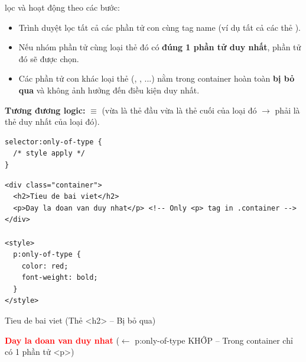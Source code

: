 \begin{conceptBox}
 lọc và hoạt động theo các bước:
\begin{itemize}[leftmargin=1.5em, itemsep=2pt, parsep=0pt]
    \item Trình duyệt lọc tất cả các phần tử con cùng tag name (ví dụ tất cả các thẻ ).
    \item Nếu nhóm phần tử cùng loại thẻ đó có \textbf{đúng 1 phần tử duy nhất}, phần tử đó sẽ được chọn.
    \item Các phần tử con khác loại thẻ (, , ...) nằm trong container hoàn toàn \textbf{bị bỏ qua} và không ảnh hưởng đến điều kiện duy nhất.
\end{itemize}
\par\vspace{4pt}
\textbf{Tương đương logic:}  $\equiv$  (vừa là thẻ đầu vừa là thẻ cuối của loại đó $\rightarrow$ phải là thẻ duy nhất của loại đó).
\end{conceptBox}

\begin{codeWindow}
\begin{lstlisting}[language=CSS3]
selector:only-of-type {
  /* style apply */
}
\end{lstlisting}
\end{codeWindow}

\begin{codeWindow}
\begin{lstlisting}[language=HTML5]
<div class="container">
  <h2>Tieu de bai viet</h2>
  <p>Day la doan van duy nhat</p> <!-- Only <p> tag in .container -->
</div>

<style>
  p:only-of-type {
    color: red;
    font-weight: bold;
  }
</style>
\end{lstlisting}
\end{codeWindow}

\begin{browserWindow}
\sffamily\small
Tieu de bai viet {\scriptsize\textcolor{gray!60}{(Thẻ <h2> -- Bị bỏ qua)}} \par\vspace{2pt}
\textcolor{red}{\textbf{Day la doan van duy nhat}} {\scriptsize\textcolor{gray!60}{($\leftarrow$ p:only-of-type KHỚP -- Trong container chỉ có 1 phần tử <p>)}}
\end{browserWindow}

